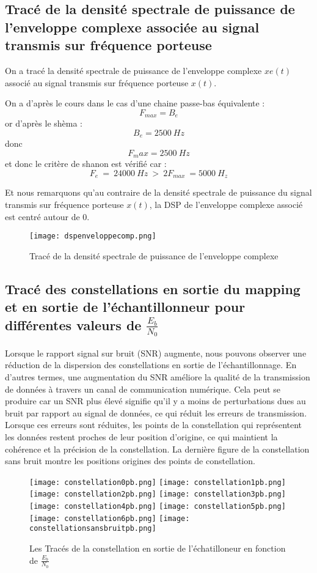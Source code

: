 \documentclass[11pt]{article}
\begin{document}
\subsection{Tracé de la densité spectrale de puissance de l’enveloppe complexe associée au signal transmis sur
fréquence porteuse}

On a tracé la densité spectrale de puissance de l'enveloppe complexe $xe(t)$ associé au signal transmis sur fréquence porteuse $x(t)$.

On a d'après le cours dans le cas d'une chaine passe-bas équivalente :
$$F_{max} = B_e$$
or d'après le shèma :
$$B_e = 2500 \ Hz$$
donc 
$$F_max = 2500 \ Hz$$
et donc le critère de shanon est vérifié car :
$$F_e \ = \ 24000 \ Hz \ > \ 2F_{max} \ = 5000 \ H_z $$

Et nous remarquons qu'au contraire de la densité spectrale de puissance du signal transmis sur fréquence porteuse $x(t)$, la DSP de l'enveloppe complexe associé est centré autour de 0.
\begin{figure}[ht!]
    \centering
    \texttt{[image: dspenveloppecomp.png]}
    \caption{Tracé de la densité spectrale de puissance de l'enveloppe complexe  \label{fig : EnveloppeComplexe}}
\end{figure}

\subsection{Tracé des constellations en sortie du mapping et en sortie de l’échantillonneur pour différentes valeurs de $\frac{E_b}{N_0}$}

Lorsque le rapport signal sur bruit (SNR) augmente, nous pouvons observer une réduction de la dispersion des constellations en sortie de l'échantillonnage. En d'autres termes, une augmentation du SNR améliore la qualité de la transmission de données à travers un canal de communication numérique. Cela peut se produire car un SNR plus élevé signifie qu'il y a moins de perturbations dues au bruit par rapport au signal de données, ce qui réduit les erreurs de transmission. Lorsque ces erreurs sont réduites, les points de la constellation qui représentent les données restent proches de leur position d'origine, ce qui maintient la cohérence et la précision de la constellation. La dernière figure de la constellation sans bruit montre les positions origines des points de constellation.
\clearpage
\begin{figure}[ht!]
    \centering
    \texttt{[image: constellation0pb.png]}
    \texttt{[image: constellation1pb.png]}
    \texttt{[image: constellation2pb.png]}
    \texttt{[image: constellation3pb.png]}
    \texttt{[image: constellation4pb.png]}
    \texttt{[image: constellation5pb.png]}
    \texttt{[image: constellation6pb.png]}
    \texttt{[image: constellationsansbruitpb.png]}
    \caption{Les Tracés de la constellation en sortie de l'échatilloneur en fonction de $\frac{E_b}{N_0}$  \label{fig : EnveloppeComplexe}}
\end{figure}
\clearpage
\end{document}
